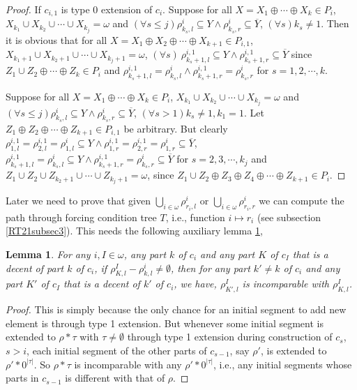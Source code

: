 \documentclass[options]{amsart}
\newtheorem{lemma}[theorem]{Lemma}
\theoremstyle{definition}
\theoremstyle{remark}
\newtheorem{Ramsey's theorem}[theorem]{Ramsey's theorem}
\begin{document}
\begin{proof}
If $c_{i,1}$ is type 0 extension
of $c_i$. Suppose
for all
$X = X_1\oplus\cdots\oplus X_k
\in P_i$,
$X_{k_1}\cup X_{k_2}\cup\cdots
\cup X_{k_j}=\omega$
and $(\forall s\leq j)
\rho^i_{k_s,l}\subseteq Y\wedge
\rho^i_{k_s,r}\subseteq \overline{Y}$,
$(\forall s)k_s\neq 1$.
Then it is obvious that
for all $X=X_1\oplus
X_2\oplus\cdots\oplus X_{k+1}
\in P_{i,1}$,
$X_{k_1+1}\cup
X_{k_2+1}\cup\cdots
\cup X_{k_j+1}=\omega$,
$(\forall s)\ \rho^{i,1}_{k_s+1,l}
\subseteq Y\wedge
\rho^{i,1}_{k_s+1,r}
\subseteq \overline{Y}$ since
 $Z_1\cup Z_2\oplus
\cdots\oplus Z_k\in P_i$
and $\rho^{i,1}_{k_s+1,l}
=\rho^i_{k_s,l}\wedge
\rho^{i,1}_{k_s+1,r}
=\rho^i_{k_s,r}$
for $s=1,2,\cdots,k$.

 Suppose
for all
$X = X_1\oplus\cdots\oplus X_k
\in P_i$,
$X_{k_1}\cup X_{k_2}\cup\cdots
\cup X_{k_j}=\omega$ and
$(\forall s\leq j)
\rho^i_{k_s,l}\subseteq Y\wedge
\rho^i_{k_s,r}\subseteq \overline{Y}$,
$(\forall s>1)k_s\neq 1,
k_1=1$.
 Let $Z_1\oplus Z_2\oplus\cdots
\oplus Z_{k+1}\in P_{i,1}$ be
arbitrary. But
clearly $\rho^{i,1}_{1,l}
=\rho^{i,1}_{2,l}=\rho^{i}_{1,l}
\subseteq Y\wedge
\rho^{i,1}_{1,r}
=\rho^{i,1}_{2,r}=\rho^{i}_{1,r}
\subseteq \overline{Y}$,
$\rho^{i,1}_{k_s+1,l}=\rho^{i}_{k_s,l}\subseteq
Y\wedge
\rho^{i,1}_{k_s+1,r}=
\rho^{i}_{k_s,r}\subseteq
\overline{Y}$ for
$s=2,3,\cdots,k_j$ and
$Z_1\cup Z_2\cup
Z_{k_2+1}\cup
\cdots
\cup Z_{k_j+1}=\omega$, since
$Z_1\cup Z_2\oplus Z_3\oplus Z_4
\oplus \cdots \oplus Z_{k+1}
\in P_i$.

\end{proof}

Later we need to prove that
given $\bigcup\limits_{i\in\omega}
\rho^i_{r_i,l}$ or
$\bigcup\limits_{i\in\omega}
\rho^i_{r_i,r}$ we can compute the
path through forcing condition
tree $T$, i.e., function
$i\mapsto r_i$
(see subsection \ref{RT21subsec3}).
This needs the following
auxiliary lemma \ref{RT21lem3},
\begin{lemma}\label{RT21lem3}
For any $i,I\in\omega$,
any part $k$ of $c_i$
and any part
$K$ of $c_I$ that is
a decent of part $k$ of
$c_i$, if
$\rho^I_{K,l}-
\rho^i_{k,l}\ne\emptyset$,
then for any part
$k'\ne k$ of $c_i$ and
 any part
$K'$ of $c_I$ that is a decent
of $k'$ of $c_i$, we have,
$\rho^I_{K',l}$ is incomparable
with $\rho^I_{K,l}$.

\end{lemma}
\begin{proof}
This is simply because
the only chance for an initial
segment to add new element is
through type 1 extension.
But whenever some
initial segment is
extended to
$\rho*\tau$ with
$\tau\ne\emptyset$
through type 1 extension
during construction of $c_s$,
$s>i$,
each initial segment of
the other parts of $c_{s-1}$,
 say $\rho'$, is
extended to $\rho'*0^{|\tau|}$.
So $\rho*\tau$ is incomparable with
any $\rho'*0^{|\tau|}$, i.e., any
initial segments whose
 parts in $c_{s-1}$ is different with
 that of $\rho$.

\end{proof}
\end{document}
